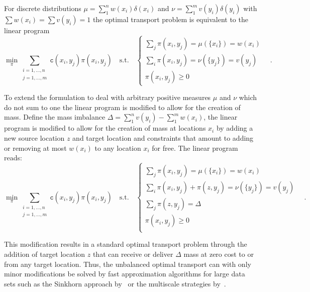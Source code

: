 \documentclass{llncs}
\newcommand{\cost}[0]{\mathtt{c}}
\newcommand{\coupling}[0]{\pi}
\begin{document}
For discrete distributions $\mu = \sum_1^n w(x_i) \delta(x_i)$ and $ \nu =
\sum_1^m v(y_i) \delta(y_i)$ with $\sum w(x_i) = \sum v(y_i) = 1$ the optimal
transport problem is equivalent to the linear program 
\begin{equation}
\min_\coupling \sum_{\substack{i=1,\dots,n\\ j=1,\dots,m}} 
      \cost(x_i, y_j) \coupling(x_i, y_j) \quad \text{s.t.}\quad 
\begin{cases}
\sum_j \coupling(x_i, y_j) = \mu(\{x_i\}) = w(x_i) & \\ 
\sum_i \coupling(x_i, y_j) = \nu(\{y_j\}) = v(y_j) & \\
 \coupling(x_i,y_j)\ge 0
\end{cases}\,.
\label{eq:balanced}
\end{equation} 

To extend the formulation to deal with arbitrary positive measures $\mu$ and
$\nu$ which do not sum to one the linear program is modified to allow for the
creation of mass. Define the mass imbalance $\Delta = \sum_1^n v(y_i)  -
\sum_1^m w(x_i)$, the linear program is modified to allow for the creation of
mass at locations $x_i$ by adding a new source location $z$ and target location
and constraints that amount to adding or removing at most $w(x_i)$ to any
location $x_i$ for free. The linear program reads: 
\begin{equation}
\min_\coupling \sum_{\substack{i=1,\dots,n\\ j=1,\dots,m}} 
      \cost(x_i, y_j) \coupling(x_i, y_j) \quad \text{s.t.}\quad 
\begin{cases}
  \sum_j \coupling(x_i, y_j)  = \mu(\{x_i\}) = w(x_i) & \\ 
  \sum_i \coupling(x_i, y_j) + \coupling(z, y_j)= \nu(\{y_j\}) = v(y_j) & \\
  \sum_j \coupling(z, y_j)  = \Delta \\
  \coupling(x_i, y_j) \ge 0 \\
\end{cases}\,.
\label{eq:unbalanced}
\end{equation} 

This modification results in a standard optimal transport problem through the
addition of target location $z$ that can receive or deliver $\Delta$ mass at
zero cost to or from any target location.  Thus, the unbalanced optimal
transport can with only minor modifications be solved by fast approximation
algorithms for large data sets such as the Sinkhorn approach
by~\cite{cuturi2013sinkhorn} or the multiscale strategies
by~\citet{gerber2017multiscale}. 
\end{document}
